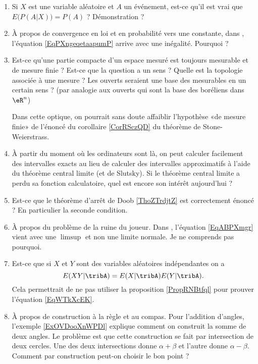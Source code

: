 \begin{enumerate}
    \item
        Si \( X\) est une variable aléatoire et \( A\) un événement, est-ce qu'il est vrai que \( E\big( P(A|X) \big)=P(A)\) ? Démonstration ?
    \item
        À propos de convergence en loi et en probabilité vers une constante, dans \cite{CourgGudRennes}, l'équation \eqref{EqPXngeqetaapumP} arrive avec une inégalité. Pourquoi ?
    \item
        Est-ce qu'une partie compacte d'un espace mesuré est toujours mesurable et de mesure finie ? Est-ce que la question a un sens ? Quelle est la topologie associée à une mesure ? Les ouverts seraient une base des mesurables en un certain sens ?  (par analogie aux ouverts qui sont la base des boréliens dans \( \eR^n\))

        Dans cette optique, on pourrait sans doute affaiblir l'hypothèse «de mesure finie» de l'énoncé du corollaire \ref{CorRSczQD} du théorème de Stone-Weierstrass.
    \item
        À partir du moment où les ordinateurs sont là, on peut calculer facilement des intervalles exacts au lieu de calculer des intervalles approximatifs à l'aide du théorème central limite (et de Slutsky). Si le théorème central limite a perdu sa fonction calculatoire, quel est encore son intérêt aujourd'hui ?
    \item
        Est-ce que le théorème d'arrêt de Doob \ref{ThoZTrdjtZ} est correctement énoncé ? En particulier la seconde condition. 
    \item
        À propos du problème de la ruine du joueur. Dans \cite{KXjFWKA}, l'équation \eqref{EqABPXmgr} vient avec une \( \limsup\) et non une limite normale. Je ne comprends pas pourquoi.
    \item
        Est-ce que si \( X\) et \( Y\) sont des variables aléatoires indépendantes on a
        \begin{equation}
            E(XY|\tribA)=E(X|\tribA)E(Y|\tribA).
        \end{equation}
        Cela permettrait de ne pas utiliser la proposition \ref{PropRNBtfql} pour prouver l'équation \eqref{EqWTkXcEK}.
    \item
        À propos de construction à la règle et au compas. Pour l'addition d'angles, l'exemple \ref{ExOVDooXnWPDl} explique comment on construit la somme de deux angles. Le problème est que cette construction se fait par intersection de deux cercles. Une des deux intersections donne \( \alpha+\beta\) et l'autre donne \( \alpha-\beta\). Comment par construction peut-on choisir le bon point ?
\end{enumerate}

